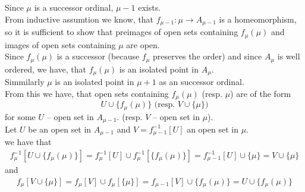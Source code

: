 Since $\mu$ is a successor ordinal, $\mu-1$ exists. \\
From inductive assumtion we know,
that $f_{\mu - 1} : \mu \to A_{\mu - 1}$ is a homeomorphism, 
so it is sufficient to show that preimages of open 
sets containing $f_\mu(\mu)$ and images of open sets containing $\mu$ are open. \\
Since $f_\mu(\mu)$ is a successor (because $f_\mu$ preserves the order) 
and since $A_\mu$ is well ordered, we have, that $f_\mu(\mu)$ 
is an isolated point in $A_\mu$. \\
Simmilarly $\mu$ is an isolated point in $\mu + 1$ as an successor ordinal. \\
From this we have, that open sets containing $f_\mu(\mu)$ (resp. $\mu$) are of the form 
\begin{equation}\label{form of open sets}
U \cup \{f_\mu(\mu)\} \textrm{ (resp. } V \cup \{\mu\}\textrm{)} 
\end{equation}
for some $U$ -- open set in $A_{\mu-1}$. 
(resp. $V$ -- open set in $\mu$). \\
Let $U$ be an open set in $A_{\mu - 1}$ and $V = f_{\mu - 1}^{-1}[U]$ an open set in $\mu$. \\
we have that 
\begin{gather}
f_\mu^{-1}\left[ U \cup \{f_\mu(\mu)\} \right] = f_\mu^{-1}\left[ U \right] \cup 
f_\mu^{-1}\left[ \{f_\mu(\mu)\} \right] =
f_{\mu - 1}^{-1}\left[ U\right] \cup \{\mu\} = V \cup \{\mu\}
\end{gather}
and
\begin{gather}
f_\mu \left[ V \cup \{\mu\} \right] = f_\mu \left[ V \right] \cup f_\mu\left[ \{\mu\} \right] = 
f_{\mu - 1} \left[ V \right] \cup \{f_\mu (\mu)\} = U \cup \{f_\mu(\mu)\}
\end{gather}
